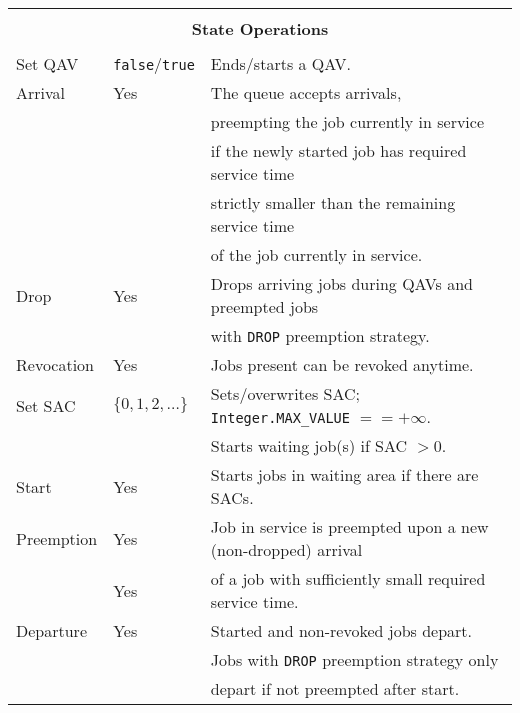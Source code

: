 \documentclass[12pt]{book}
\begin{document}
\begin{tabular}{|l|l|l|}
\hline
\multicolumn{3}{|c|}{} \\
\multicolumn{3}{|c|}{\bf State Operations} \\
\multicolumn{3}{|c|}{} \\
\hline
Set QAV & \lstinline|false|/\lstinline|true| & Ends/starts a QAV. \\
\hline
Arrival & Yes & The queue accepts arrivals, \\
        &     & preempting the job currently in service \\
        &     & if the newly started job has required service time \\
        &     & strictly smaller than the remaining service time \\
        &     & of the job currently in service. \\
\hline
Drop & Yes & Drops arriving jobs during QAVs and preempted jobs \\
     &     & with \lstinline|DROP| preemption strategy. \\
\hline
Revocation & Yes & Jobs present can be revoked anytime. \\
\hline
Set SAC & $\{0, 1, 2, \ldots\}$ & Sets/overwrites SAC; \lstinline|Integer.MAX_VALUE| $== +\infty$. \\
        &                       & Starts waiting job(s) if SAC $> 0$. \\
\hline
Start & Yes & Starts jobs in waiting area if there are SACs. \\
\hline
Preemption & Yes & Job in service is preempted upon a new (non-dropped) arrival \\
           & Yes & of a job with sufficiently small required service time. \\
\hline
Departure & Yes & Started and non-revoked jobs depart. \\
          &     & Jobs with \lstinline|DROP| preemption strategy only \\
          &     & depart if not preempted after start. \\
\hline
\end{tabular}
\end{document}

